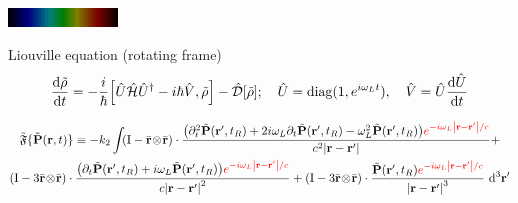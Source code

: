\documentclass[aspectratio=169]{beamer}
\newcommand{\oper}[1]{\mathcal{#1}}
\newcommand{\outerprod}[2]{#1 \! \otimes \! #2}
\begin{document}
\begin{frame}
  \includegraphics[width=\textwidth, height=0.5cm]{figures/Helium_spectrum_visible}
      \begin{block}{Liouville equation (rotating frame)}
        \begin{gather*}
          \dv{\tilde{\rho}}{t} = -\frac{i}{\hbar} \commutator{\hat{U}\hat{\oper{H}}\hat{U}^\dagger - i\hbar \hat{V}}{\tilde{\rho}} - \hat{\oper{D}}\qty[\tilde{\rho}]; \quad \hat{U} = \mathrm{diag}(1, e^{i \omega_L t}), \quad \hat{V} = \hat{U} \dv{\hat{U}}{t}
        \end{gather*}
      \end{block}

      \begin{gather*}
        \tilde{\mathfrak{F}}\{ \tilde{\vb{P}}(\vb{r}, t) \} \equiv -k_2 \int_{}
        \qty(\mathrm{I} -  \outerprod{\bar{\vb{r}}}{\bar{\vb{r}}} ) \cdot \frac{\qty(\partial_t^2 \tilde{\vb{P}}(\vb{r}', t_R) + 2 i \omega_L \partial_t \tilde{\vb{P}}(\vb{r}', t_R) - \omega_L^2 \tilde{\vb{P}}(\vb{r}', t_R)) \textcolor{red}{e^{-i \omega_L \abs{\vb{r} - \vb{r}'}/c}}}{c^2 \abs{\vb{r}-\vb{r}'}} + \\
        \qty(\mathrm{I} - 3\outerprod{\bar{\vb{r}}}{\bar{\vb{r}}} ) \cdot \frac{\qty(\partial_t \tilde{\vb{P}}(\vb{r}', t_R) + i \omega_L \tilde{\vb{P}}(\vb{r}', t_R))\textcolor{red}{e^{-i \omega_L \abs{\vb{r} - \vb{r}'}/c}}}{c \abs{\vb{r}-\vb{r}'}^2} +
        \qty(\mathrm{I} - 3\outerprod{\bar{\vb{r}}}{\bar{\vb{r}}} ) \cdot \frac{                \tilde{\vb{P}}(\vb{r}', t_R) \textcolor{red}{e^{-i \omega_L \abs{\vb{r} - \vb{r}'}/c}}}{\abs{\vb{r}-\vb{r}'}^3}
        \, \dd[3]{\vb{r'}}
      \end{gather*}
\end{frame}

\begin{frame}
  
\end{frame}
\end{document}
